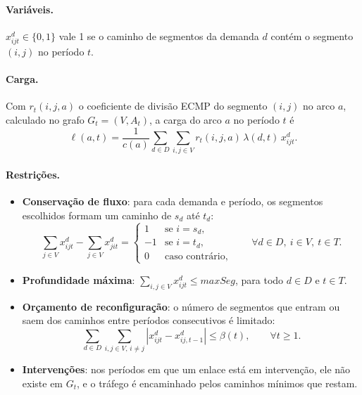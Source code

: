 \paragraph{Variáveis.} $x^d_{ijt} \in \{0, 1\}$ vale 1 se o caminho de segmentos da demanda $d$ contém o segmento $(i, j)$ no período $t$.

\paragraph{Carga.} Com $r_t(i, j, a)$ o coeficiente de divisão ECMP do segmento $(i, j)$ no arco $a$, calculado no grafo $G_t = (V, A_t)$, a carga do arco $a$ no período $t$ é
\begin{equation}
    \ell(a, t) = \frac{1}{c(a)} \sum_{d \in D} \sum_{i, j \in V} r_t(i, j, a)\, \lambda(d, t)\, x^d_{ijt}.
\end{equation}

\paragraph{Restrições.}
\begin{itemize}
    \item \textbf{Conservação de fluxo}: para cada demanda e período, os segmentos escolhidos formam um caminho de $s_d$ até $t_d$:
    \begin{equation}
        \sum_{j \in V} x^d_{ijt} - \sum_{j \in V} x^d_{jit} =
        \begin{cases} 1 & \text{se } i = s_d,\\ -1 & \text{se } i = t_d,\\ 0 & \text{caso contrário,} \end{cases}
        \qquad \forall d \in D,\ i \in V,\ t \in T.
    \end{equation}
    \item \textbf{Profundidade máxima}: $\sum_{i, j \in V} x^d_{ijt} \leq \mathit{maxSeg}$, para todo $d \in D$ e $t \in T$.
    \item \textbf{Orçamento de reconfiguração}: o número de segmentos que entram ou saem dos caminhos entre períodos consecutivos é limitado:
    \begin{equation}
        \sum_{d \in D} \sum_{i, j \in V,\, i \neq j} \left| x^d_{ijt} - x^d_{ij,t-1} \right| \leq \beta(t), \qquad \forall t \geq 1.
    \end{equation}
    \item \textbf{Intervenções}: nos períodos em que um enlace está em intervenção, ele não existe em $G_t$, e o tráfego é encaminhado pelos caminhos mínimos que restam.
\end{itemize}

